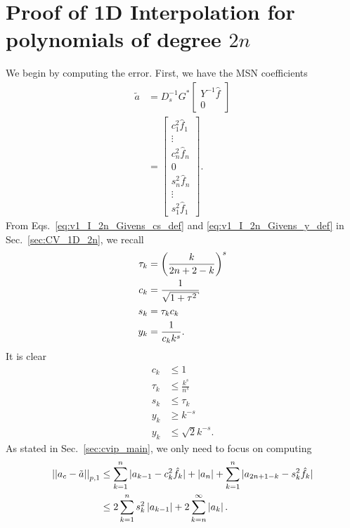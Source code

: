 \section{Proof of 1D Interpolation for polynomials of degree $2n$}
\label{sec:cvip_interp_1D}

We begin by computing the error. First, we have the MSN coefficients
%
\begin{align}
    \tilde{a} &= D_{s}^{-1}G^{*}\begin{bmatrix} Y^{-1}\hat{f} \\ 0 \end{bmatrix}
        \nonumber\\
    &= \begin{bmatrix} c_{1}^{2}\hat{f}_{1} \\ \vdots \\ c_{n}^{2}\hat{f}_{n} \\
        0 \\  s_{n}^{2}\hat{f}_{n} \\ \vdots \\ s_{1}^{2}\hat{f}_{1}
        \end{bmatrix}.
    \label{eq:cvip_interp_1D_msn_coefs}
\end{align}
%
From Eqs.~\eqref{eq:v1_I_2n_Givens_cs_def} and \eqref{eq:v1_I_2n_Givens_y_def}
in Sec.~\ref{sec:CV_1D_2n}, we recall
%
\begin{align}
    \tau_{k} &= \parens{\frac{k}{2n+2-k}}^{s} \nonumber\\
    c_{k} &= \frac{1}{\sqrt{1+\tau^{2}}} \nonumber\\
    s_{k} &= \tau_{k}c_{k} \nonumber\\
    y_{k} &= \frac{1}{c_{k}k^{s}}.
\end{align}
%
It is clear
%
\begin{align}
    c_{k} & \le 1 \nonumber\\
    \tau_{k} &\le \frac{k^{s}}{n^{s}} \nonumber\\
    s_{k} &\le \tau_{k} \nonumber\\
    y_{k} &\ge k^{-s} \nonumber\\
    y_{k} &\le \sqrt{2}k^{-s}.
\end{align}
%
As stated in Sec.~\ref{sec:cvip_main}, we only need to focus on computing
%
\begin{align}
    \left| \left| a_{c} - \tilde{a} \right| \right|_{p,1}
        &\le \sum_{k=1}^{n}|a_{k-1}-c_{k}^{2}\hat{f}_{k}|
            + \left| a_{n} \right| + \sum_{k=1}^{n}|a_{2n+1-k}-s_{k}^{2}\hat{f}_{k}|
            \nonumber\\
        &\le 2\sum_{k=1}^{n}s_{k}^{2}\left| a_{k-1} \right|
            + 2\sum_{k=n}^{\infty}\left| a_{k} \right|.
\end{align}

